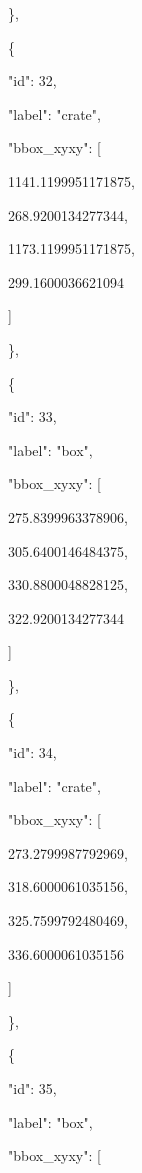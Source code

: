 \documentclass[10pt,a4paper]{article}
\begin{document}
    \},\allowbreak{}\par
    \{\par
      "id":\allowbreak{} 32,\allowbreak{}\par
      "label":\allowbreak{} "crate",\allowbreak{}\par
      "bbox\_xyxy":\allowbreak{} [\par
        1141.1199951171875,\allowbreak{}\par
        268.9200134277344,\allowbreak{}\par
        1173.1199951171875,\allowbreak{}\par
        299.1600036621094\par
      ]\par
    \},\allowbreak{}\par
    \{\par
      "id":\allowbreak{} 33,\allowbreak{}\par
      "label":\allowbreak{} "box",\allowbreak{}\par
      "bbox\_xyxy":\allowbreak{} [\par
        275.8399963378906,\allowbreak{}\par
        305.6400146484375,\allowbreak{}\par
        330.8800048828125,\allowbreak{}\par
        322.9200134277344\par
      ]\par
    \},\allowbreak{}\par
    \{\par
      "id":\allowbreak{} 34,\allowbreak{}\par
      "label":\allowbreak{} "crate",\allowbreak{}\par
      "bbox\_xyxy":\allowbreak{} [\par
        273.2799987792969,\allowbreak{}\par
        318.6000061035156,\allowbreak{}\par
        325.7599792480469,\allowbreak{}\par
        336.6000061035156\par
      ]\par
    \},\allowbreak{}\par
    \{\par
      "id":\allowbreak{} 35,\allowbreak{}\par
      "label":\allowbreak{} "box",\allowbreak{}\par
      "bbox\_xyxy":\allowbreak{} [\par
\end{document}
